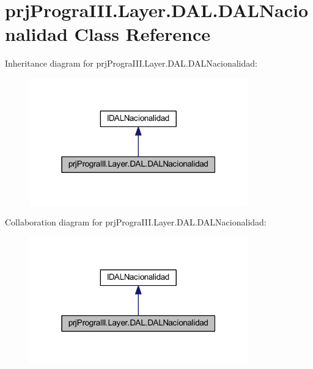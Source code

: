 \hypertarget{classprj_progra_i_i_i_1_1_layer_1_1_d_a_l_1_1_d_a_l_nacionalidad}{}\section{prj\+Progra\+I\+I\+I.\+Layer.\+D\+A\+L.\+D\+A\+L\+Nacionalidad Class Reference}
\label{classprj_progra_i_i_i_1_1_layer_1_1_d_a_l_1_1_d_a_l_nacionalidad}


Inheritance diagram for prj\+Progra\+I\+I\+I.\+Layer.\+D\+A\+L.\+D\+A\+L\+Nacionalidad\+:
\nopagebreak
\begin{figure}[H]
\begin{center}
\leavevmode
\includegraphics[width=268pt]{classprj_progra_i_i_i_1_1_layer_1_1_d_a_l_1_1_d_a_l_nacionalidad__inherit__graph}
\end{center}
\end{figure}


Collaboration diagram for prj\+Progra\+I\+I\+I.\+Layer.\+D\+A\+L.\+D\+A\+L\+Nacionalidad\+:
\nopagebreak
\begin{figure}[H]
\begin{center}
\leavevmode
\includegraphics[width=268pt]{classprj_progra_i_i_i_1_1_layer_1_1_d_a_l_1_1_d_a_l_nacionalidad__coll__graph}
\end{center}
\end{figure}
